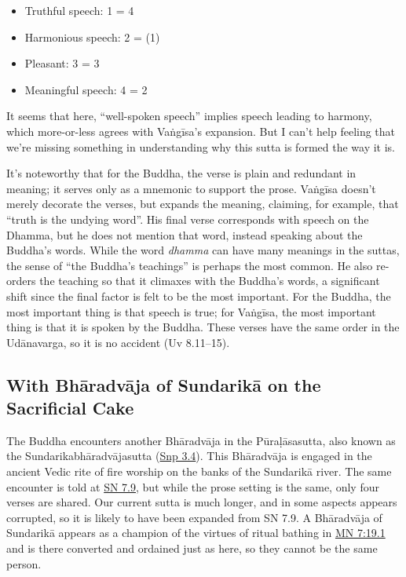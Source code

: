 \documentclass[12pt,openany]{book}%
\begin{document}
\begin{itemize}%
\item Truthful speech: 1 = 4%
\item Harmonious speech: 2 = (1)%
\item Pleasant: 3 = 3%
\item Meaningful speech: 4 = 2%
\end{itemize}

It seems that here, “well-spoken speech” implies speech leading to harmony, which more-or-less agrees with \textsanskrit{Vaṅgīsa}’s expansion. But I can’t help feeling that we’re missing something in understanding why this sutta is formed the way it is.

It’s noteworthy that for the Buddha, the verse is plain and redundant in meaning; it serves only as a mnemonic to support the prose. \textsanskrit{Vaṅgīsa} doesn’t merely decorate the verses, but expands the meaning, claiming, for example, that “truth is the undying word”. His final verse corresponds with speech on the Dhamma, but he does not mention that word, instead speaking about the Buddha’s words. While the word \textit{dhamma} can have many meanings in the suttas, the sense of “the Buddha’s teachings” is perhaps the most common. He also re-orders the teaching so that it climaxes with the Buddha’s words, a significant shift since the final factor is felt to be the most important. For the Buddha, the most important thing is that speech is true; for \textsanskrit{Vaṅgīsa}, the most important thing is that it is spoken by the Buddha. These verses have the same order in the \textsanskrit{Udānavarga}, so it is no accident (Uv 8.11–15).

\subsection*{With \textsanskrit{Bhāradvāja} of \textsanskrit{Sundarikā} on the Sacrificial Cake}

The Buddha encounters another \textsanskrit{Bhāradvāja} in the \textsanskrit{Pūraḷāsasutta}, also known as the \textsanskrit{Sundarikabhāradvājasutta} (\href{https://suttacentral.net/snp3.4/en/sujato}{Snp 3.4}). This \textsanskrit{Bhāradvāja} is engaged in the ancient Vedic rite of fire worship on the banks of the \textsanskrit{Sundarikā} river. The same encounter is told at \href{https://suttacentral.net/sn7.9/en/sujato}{SN 7.9}, but while the prose setting is the same, only four verses are shared. Our current sutta is much longer, and in some aspects appears corrupted, so it is likely to have been expanded from SN 7.9. A \textsanskrit{Bhāradvāja} of \textsanskrit{Sundarikā} appears as a champion of the virtues of ritual bathing in \href{https://suttacentral.net/mn7/en/sujato\#19.1}{MN 7:19.1} and is there converted and ordained just as here, so they cannot be the same person.
\end{document}
